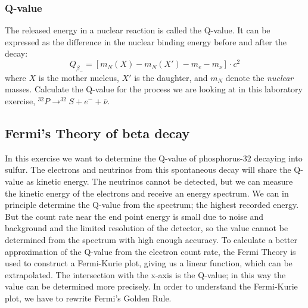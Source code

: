 \documentclass[a4,11pt, notitlepage]{article}
\begin{document}
\subsubsection{Q-value}

The released energy in a nuclear reaction is called the Q-value. It can be expressed as the difference in the nuclear binding energy before and after the decay: \begin{equation}
  Q_{\beta_-}=[m_{N}(X)-m_{N}(X')-m_e-m_{\nu}]\cdot c^2
\end{equation}
where $X$ is the mother nucleus, $X'$ is the daughter, and $m_N$ denote the \textit{nuclear} masses. Calculate the Q-value for the process we are looking at in this laboratory exercise, $^{32}P\rightarrow ^{32}S + e^- + \bar{\nu}$. 


%
%
%


\subsection{Fermi's Theory of beta decay}

In this exercise we want to determine the Q-value of phosphorus-32
decaying into sulfur. The electrons and neutrinos from this
spontaneous decay will share the Q-value as kinetic energy. The
neutrinos cannot be detected, but we can measure the kinetic energy of
the electrons and receive an energy spectrum. We can in principle
determine the Q-value from the spectrum; the highest recorded
energy. But the count rate near the end point energy is small due to
noise and background and the limited resolution of the detector, so
the value cannot be determined from the spectrum with high enough
accuracy. To calculate a better approximation of the Q-value from the
electron count rate, the Fermi Theory is used to construct a
Fermi-Kurie plot, giving us a linear function, which can be
extrapolated. The intersection with the x-axis is the Q-value; in this
way the value can be determined more precisely. In order to understand
the Fermi-Kurie plot, we have to rewrite Fermi's Golden Rule.
\end{document}
